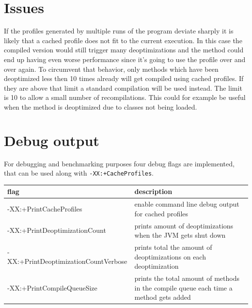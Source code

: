 \section{Issues}
\label{s:issues}
If the profiles generated by multiple runs of the program deviate sharply it is likely that a cached profile does not fit to the current execution. In this case the compiled version would still trigger many deoptimizations and the method could end up having even worse performance since it's going to use the profile over and over again.
To circumvent that behavior, only methods which have been deoptimized less then 10 times already will get compiled using cached profiles. If they are above that limit a standard compilation will be used instead.
The limit is 10 to allow a small number of recompilations. This could for example be useful when the method is deoptimized due to classes not being loaded. 
\section{Debug output}
\label{s:debugoutput}
For debugging and benchmarking purposes four debug flags are implemented, that can be used along with \texttt{-XX:+CacheProfiles}.
\begin{table}[ht]
  \centering
  \label{t:debugflags}
  \begin{center}
    \begin{tabular}{| l | p{9.0cm} |}
       \hline
       \textbf{flag} & \textbf{description} \\ \hline\hline
       -XX:+PrintCacheProfiles & enable command line debug output for cached profiles\\ \hline
       -XX:+PrintDeoptimizationCount & prints amount of deoptimizations when the JVM gets shut down\\ \hline
       -XX:+PrintDeoptimizationCountVerbose & prints total the amount of deoptimizations on each deoptimization\\ \hline
       -XX:+PrintCompileQueueSize & prints the total amount of methods in the compile queue each time a method gets added \\ \hline
    \end{tabular}
  \end{center}
\end{table}

 

